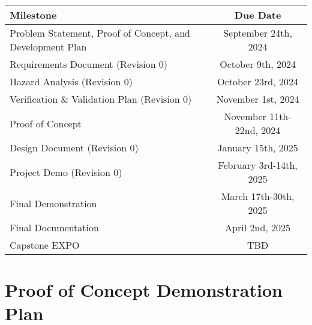 \documentclass{article}
\begin{document}
\begin{center}
  \begin{tabularx}{\textwidth}{Xc}
    \toprule
    \textbf{Milestone} & \textbf{Due Date} \\
    \midrule
    Problem Statement, Proof of Concept, and Development Plan & September 24th, 2024 \\
    Requirements Document (Revision 0) & October 9th, 2024 \\
    Hazard Analysis (Revision 0) & October 23rd, 2024 \\
    Verification \& Validation Plan (Revision 0) & November 1st, 2024 \\
    Proof of Concept & November 11th-22nd, 2024 \\
    Design Document (Revision 0) & January 15th, 2025 \\
    Project Demo (Revision 0) & February 3rd-14th, 2025 \\
    Final Demonstration & March 17th-30th, 2025 \\
    Final Documentation & April 2nd, 2025 \\
    Capstone EXPO & TBD \\
    \bottomrule
  \end{tabularx}
\end{center}


\section{Proof of Concept Demonstration Plan}
\end{document}
